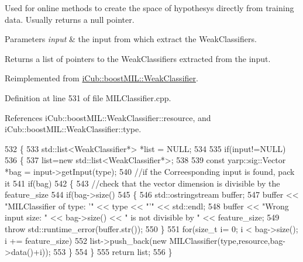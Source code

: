 Used for online methods to create the space of hypothesys directly from training data. Usually returns a null pointer.


\begin{DoxyParams}{Parameters}
{\em input} & the input from which extract the Weak\+Classifiers. \\
\hline
\end{DoxyParams}
\begin{DoxyReturn}{Returns}
a list of pointers to the Weak\+Classifiers extracted from the input. 
\end{DoxyReturn}


Reimplemented from \hyperlink{classiCub_1_1boostMIL_1_1WeakClassifier_abdf0b9bd48be536cd44939dc733097ed}{i\+Cub\+::boost\+M\+I\+L\+::\+Weak\+Classifier}.



Definition at line 531 of file M\+I\+L\+Classifier.\+cpp.



References i\+Cub\+::boost\+M\+I\+L\+::\+Weak\+Classifier\+::resource, and i\+Cub\+::boost\+M\+I\+L\+::\+Weak\+Classifier\+::type.


\begin{DoxyCode}
532 \{
533     std::list<WeakClassifier*> *list = NULL;
534 
535     \textcolor{keywordflow}{if}(input!=NULL)
536     \{
537         list=\textcolor{keyword}{new} std::list<WeakClassifier*>;
538 
539         \textcolor{keyword}{const} yarp::sig::Vector *bag = input->getInput(type);
540         \textcolor{comment}{//if the Correesponding input is found, pack it}
541         \textcolor{keywordflow}{if}(bag)
542         \{
543             \textcolor{comment}{//check that the vector dimension is divisible by the feature\_size}
544             \textcolor{keywordflow}{if}(bag->size()%
545             \{
546                 std::ostringstream buffer;
547                 buffer << \textcolor{stringliteral}{"MILClassifier of type: '"} << type << \textcolor{stringliteral}{"'"} << std::endl;
548                 buffer << \textcolor{stringliteral}{"Wrong input size: "} << bag->size() << \textcolor{stringliteral}{" is not divisible by "} << feature\_size;
549                 \textcolor{keywordflow}{throw} std::runtime\_error(buffer.str());
550             \}
551             \textcolor{keywordflow}{for}(\textcolor{keywordtype}{size\_t} i= 0; i < bag->size(); i += feature\_size)
552                 list->push\_back(\textcolor{keyword}{new} MILClassifier(type,resource,bag->data()+i));
553         \}
554     \}
555     \textcolor{keywordflow}{return} list;
556 \}
\end{DoxyCode}

